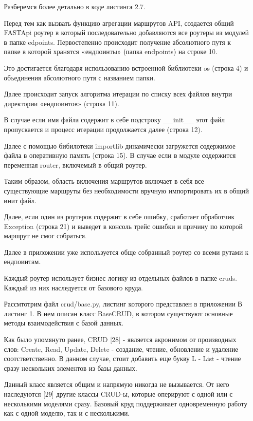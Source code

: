 \documentclass[a4paper,14pt,oneside]{extreport}
\begin{document}
Разберемся более детально в коде листинга 2.7. 

Перед тем как вызвать функцию агрегации маршрутов API, создается общий FASTApi роутер в который последовательно добавляются все роутеры из модулей в папке edpoints. Первостепенно происходит получение абсолютного путя к папке в которой хранятся «ендпоинты» (папка endpoints) на строке 10. 

Это достигается благодаря использованию встроенной библиотеки os (строка 4) и объединения абсолютного путя с названием папки.

Далее происходит запуск алгоритма итерации по списку всех файлов внутри директории «ендпоинтов» (строка 11).

В случае если имя файла содержит в себе подстроку \_\_init\_\_ этот файл пропускается и процесс итерации продолжается далее (строка 12).

Далее с помощью бибилотеки importlib динамически загружется содержимое файла в оперативную память (строка 15). В случае если в модуле содержится переменная router, включемый в общий роутер.

Таким образом, область включения маршрутов включает в себя все существующие маршруты без необходимости вручную импортировать их в общий инит файл.

Далее,  если один из роутеров содержит в себе ошибку, сработает обработчик Exception (строка 21) и выведет в консоль трейс ошибки и причину по которой маршрут не смог собраться. 

Далее в приложении уже используется обще собранный роутер со всеми рутами к ендпоинтам.

Каждый роутер использует бизнес логику из отдельных файлов в папке cruds. Каждый из них наследуется от базового круда.

Рассмтотрим файл crud/base.py, листинг которого представлен в приложении В листинг 1. В нем описан класс BaseCRUD, в котором существуют основные методы взаимодействия с базой данных.

Как было упомянуто ранее, CRUD [28] - является акронимом от производных слов: Create, Read, Update, Delete - создание, чтение, обновление и удаление соотстветственно. В данном случае, стоит добавить еще букву L - List - чтение сразу нескольких элементов из базы данных.

Данный класс является общим и напрямую никогда не вызывается. От него наследуются [29] другие классы CRUD-ы, которые оперируют с одной или с несколькими моделями сразу. Базовый круд поддерживает одновременную работу как с одной моделю, так и с несколькими.
\end{document}

